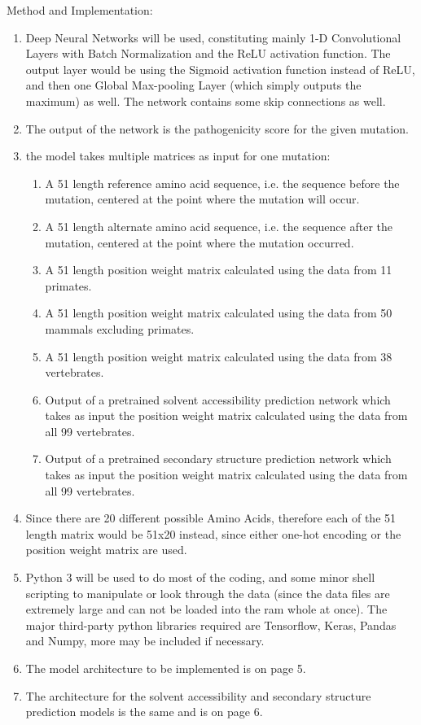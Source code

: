 \documentclass[twoside]{article}
\begin{document}
\begin{enumerate}
	 Method and Implementation:
	 \begin{enumerate}
	 \item Deep Neural Networks will be used, constituting mainly 1-D Convolutional Layers with Batch Normalization and the ReLU activation function. The output layer would be using the Sigmoid activation function instead of ReLU, and then one Global Max-pooling Layer (which simply outputs the maximum) as well. The network contains some skip connections as well.
	 \item The output of the network is the pathogenicity score for the given mutation.
	 \item the model takes multiple matrices as input for one mutation:
	 \begin{enumerate}
	 	\item A 51 length reference amino acid sequence, i.e. the sequence before the mutation, centered at the point where the mutation will occur.
	 	\item A 51 length alternate amino acid sequence, i.e. the sequence after the mutation, centered at the point where the mutation occurred.
	 	\item A 51 length position weight matrix calculated using the data from 11 primates.
	 	\item A 51 length position weight matrix calculated using the data from 50 mammals excluding primates.
	 	\item A 51 length position weight matrix calculated using the data from 38 vertebrates.
	 	\item Output of a pretrained solvent accessibility prediction network which takes as input the position weight matrix calculated using the data from all 99 vertebrates.
	 	\item Output of a pretrained secondary structure prediction network which takes as input the position weight matrix calculated using the data from all 99 vertebrates.
  	 \end{enumerate}
   	 \item Since there are 20 different possible Amino Acids, therefore each of the 51 length matrix would be 51x20 instead, since either one-hot encoding or the position weight matrix are used.
   	 \item Python 3 will be used to do most of the coding, and some minor shell scripting to manipulate or look through the data (since the data files are extremely large and can not be loaded into the ram whole at once). The major third-party python libraries required are Tensorflow, Keras, Pandas and Numpy, more may be included if necessary.
   	 \item The model architecture to be implemented is on page 5.
   	 \item The architecture for the solvent accessibility and secondary structure prediction models is the same and is on page 6.
	 \end{enumerate}


\end{enumerate}
\end{document}
